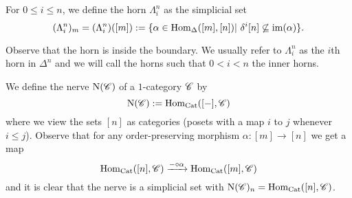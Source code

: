 \documentclass[../../thesis.tex]{subfiles}
\begin{document}
\begin{definition}
    For $0\leq i \leq n$, we define the horn $\Lambda_i^n$ as the simplicial set
    \[
        (\Lambda_i^n)_m =(\Lambda_i^n)([m]) :=\{\alpha \in \Hom_{\Delta}([m], [n]) | \delta^i[n] \not\subseteq \mathrm{im}(\alpha)\}.
    \]
\end{definition}
Observe that the horn is inside the boundary.
We usually refer to $\Lambda_i^n$ as the $i$th horn in $\Delta^n$ and we will call the horns such that $0<i<n$ the inner horns.
\begin{example}
\end{example}
\begin{example}\label{NerveDef}
    We define the nerve $\mathrm{N}(\mathscr{C})$ of a $1$-category $\mathscr{C}$ by
    \[
        \mathrm{N}(\mathscr{C}) : = \mathrm{Hom}_{\mathrm{Cat}}([{-}], \mathscr{C})
    \]
    where we view the sets $[n]$ as categories (posets with a map $i$ to $j$ whenever $i\leq j$).
    Observe that for any order-preserving morphism $\alpha : [m] \to [n]$ we get a map
    \[
        \mathrm{Hom}_{\mathrm{Cat}}([n], \mathscr{C}) \xrightarrow{{-} \circ \alpha} \mathrm{Hom}_{\mathrm{Cat}}([m], \mathscr{C})
    \]
    and it is clear that the nerve is a simplicial set with $\mathrm{N}(\mathscr{C})_n = \mathrm{Hom}_{\mathrm{Cat}}([n], \mathscr{C})$.
\end{example}
\end{document}
